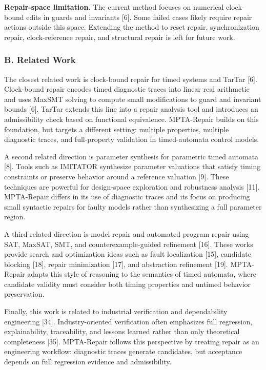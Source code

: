\documentclass[
]{article}
\begin{document}
\textbf{Repair-space limitation.} The current method focuses on
numerical clock-bound edits in guards and invariants {[}6{]}. Some
failed cases likely require repair actions outside this space. Extending
the method to reset repair, synchronization repair, clock-reference
repair, and structural repair is left for future work.

\subsubsection{B. Related Work}\label{b.-related-work}

The closest related work is clock-bound repair for timed systems and
TarTar {[}6{]}. Clock-bound repair encodes timed diagnostic traces into
linear real arithmetic and uses MaxSMT solving to compute small
modifications to guard and invariant bounds {[}6{]}. TarTar extends this
line into a repair analysis tool and introduces an admissibility check
based on functional equivalence. MPTA-Repair builds on this foundation,
but targets a different setting: multiple properties, multiple
diagnostic traces, and full-property validation in timed-automata
control models.

A second related direction is parameter synthesis for parametric timed
automata {[}8{]}. Tools such as IMITATOR synthesize parameter valuations
that satisfy timing constraints or preserve behavior around a reference
valuation {[}9{]}. These techniques are powerful for design-space
exploration and robustness analysis {[}11{]}. MPTA-Repair differs in its
use of diagnostic traces and its focus on producing small syntactic
repairs for faulty models rather than synthesizing a full parameter
region.

A third related direction is model repair and automated program repair
using SAT, MaxSAT, SMT, and counterexample-guided refinement {[}16{]}.
These works provide search and optimization ideas such as fault
localization {[}15{]}, candidate blocking {[}18{]}, repair minimization
{[}17{]}, and abstraction refinement {[}19{]}. MPTA-Repair adapts this
style of reasoning to the semantics of timed automata, where candidate
validity must consider both timing properties and untimed behavior
preservation.

Finally, this work is related to industrial verification and
dependability engineering {[}34{]}. Industry-oriented verification often
emphasizes full regression, explainability, traceability, and lessons
learned rather than only theoretical completeness {[}35{]}. MPTA-Repair
follows this perspective by treating repair as an engineering workflow:
diagnostic traces generate candidates, but acceptance depends on full
regression evidence and admissibility.
\end{document}
